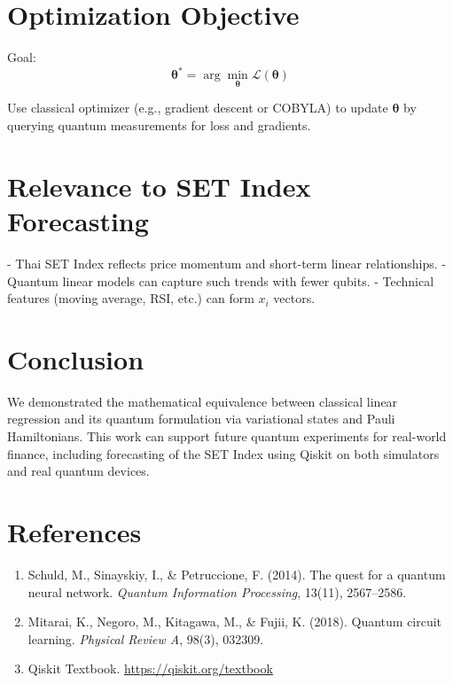 \documentclass[11pt]{article}
\begin{document}
\section{Optimization Objective}
Goal:
\[
\bm{\theta}^* = \arg \min_{\bm{\theta}} \mathcal{L}(\bm{\theta})
\]

Use classical optimizer (e.g., gradient descent or COBYLA) to update $\bm{\theta}$ by querying quantum measurements for loss and gradients.

\section{Relevance to SET Index Forecasting}
- Thai SET Index reflects price momentum and short-term linear relationships.
- Quantum linear models can capture such trends with fewer qubits.
- Technical features (moving average, RSI, etc.) can form $x_i$ vectors.

\section{Conclusion}
We demonstrated the mathematical equivalence between classical linear regression and its quantum formulation via variational states and Pauli Hamiltonians. This work can support future quantum experiments for real-world finance, including forecasting of the SET Index using Qiskit on both simulators and real quantum devices.

\section*{References}
\begin{enumerate}
    \item Schuld, M., Sinayskiy, I., \& Petruccione, F. (2014). The quest for a quantum neural network. \emph{Quantum Information Processing}, 13(11), 2567–2586.
    \item Mitarai, K., Negoro, M., Kitagawa, M., \& Fujii, K. (2018). Quantum circuit learning. \emph{Physical Review A}, 98(3), 032309.
    \item Qiskit Textbook. \url{https://qiskit.org/textbook}
\end{enumerate}
\end{document}
